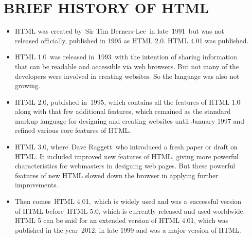 \documentclass{article}
\begin{document}
	\section*{BRIEF HISTORY OF HTML}
	\begin{itemize}
		\item HTML was created by Sir Tim Berners-Lee in late 1991 but was not released officially, published in 1995 as HTML 2.0. HTML 4.01 was published.
		\item HTML 1.0 was released in 1993 with the intention of sharing information that can be readable and accessible via web browsers. But not many of the developers were involved in creating websites. So the language was also not growing.
		\item HTML 2.0, published in 1995, which contains all the features of HTML 1.0 along with that few additional features, which remained as the standard markup language for designing and creating websites until January 1997 and refined various core features of HTML.
		\item HTML 3.0, where Dave Raggett who introduced a fresh paper or draft on HTML. It included improved new features of HTML, giving more powerful characteristics for webmasters in designing web pages. But these powerful features of new HTML slowed down the browser in applying further improvements.
		\item Then comes HTML 4.01, which is widely used and was a successful version of HTML before HTML 5.0, which is currently released and used worldwide. HTML 5 can be said for an extended version of HTML 4.01, which was published in the year 2012.
		in late 1999 and was a major version of HTML.
	\end{itemize}
	\newpage
\end{document}
